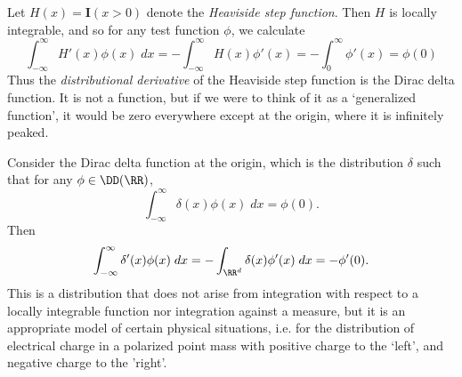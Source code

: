 \begin{example}
    Let $H(x) = \mathbf{I}(x > 0)$ denote the {\it Heaviside step function}. Then $H$ is locally integrable, and so for any test function $\phi$, we calculate
    \[ \int_{-\infty}^\infty H'(x) \phi(x)\; dx = - \int_{-\infty}^\infty H(x) \phi'(x) = - \int_0^\infty \phi'(x) = \phi(0) \]
    Thus the \emph{distributional derivative} of the Heaviside step function is the Dirac delta function. It is not a function, but if we were to think of it as a `generalized function', it would be zero everywhere except at the origin, where it is infinitely peaked.
\end{example}

\begin{example}
    Consider the Dirac delta function at the origin, which is the distribution $\delta$ such that for any $\phi \in \DD(\RR)$,
    \[ \int_{-\infty}^\infty \delta(x) \phi(x)\; dx = \phi(0). \]
    Then
    \[ \int_{-\infty}^\infty \delta'(x) \phi(x)\; dx = - \int_{\RR^d} \delta(x) \phi'(x)\; dx = - \phi'(0). \]
    This is a distribution that does not arise from integration with respect to a locally integrable function nor integration against a measure, but it is an appropriate model of certain physical situations, i.e. for the distribution of electrical charge in a polarized point mass with positive charge to the `left', and negative charge to the 'right'.
\end{example}

